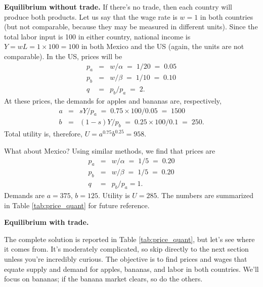\textbf{Equilibrium without trade.} If there's no trade, then each
country will produce both products.  Let us say that the wage rate
is $w = 1$ in both countries (but not comparable, because they may
be measured in different units).  Since the total labor input
is 100 in either country, national income is $Y = wL = 1\times 100
= 100$ in both Mexico and the US (again, the units are not comparable).
In the US, prices will be
\begin{eqnarray*}
    p_{a} &=& w/\alpha \;=\; {1}/{20} \;=\; 0.05\\
    p_{b} &=& {w}/{\beta} \;=\; {1}/{10} \;=\; 0.10\\
    q &=& {p_{b}}/{p_{a}} \;=\; 2.
\end{eqnarray*}
At these prices, the demands for apples and bananas are, respectively,
\begin{eqnarray*}
    a &=& {sY}/{p_{a}} \;=\; {0.75\times 100}/{0.05} \;=\; 1500\\
    b &=& {(1-s)Y}/{p_{b}} \;=\; {0.25\times 100}/{0.1} \;=\; 250 .
\end{eqnarray*}
Total utility is, therefore, $U = a^{0.75}b^{0.25} = 958$.

What about Mexico? Using similar methods, we find that prices are
%
\begin{eqnarray*}
    p_{a} &=&  {w}/{\alpha} \;=\; {1}/{5} \;=\; 0.20 \\
    p_{b} &=&  {w}/{\beta} \;=\; {1}/{5} \;=\; 0.20 \\
    q &=& {p_{b}}/{p_{a}} = 1.
\end{eqnarray*}
Demands are $a = 375$, $b = 125$. Utility is $U = 285$.  The
numbers are summarized in Table \ref{tab:price_quant} for future
reference.


\textbf{Equilibrium with trade.}

The complete solution is reported in Table \ref{tab:price_quant},
but let's see where it comes from.
It's moderately complicated,
so skip directly to the next section unless you're
incredibly curious.
The objective is to find prices and wages that equate
supply and demand for apples, bananas, and labor in both countries.
We'll focus on bananas; if the banana market clears,
so do the others.



